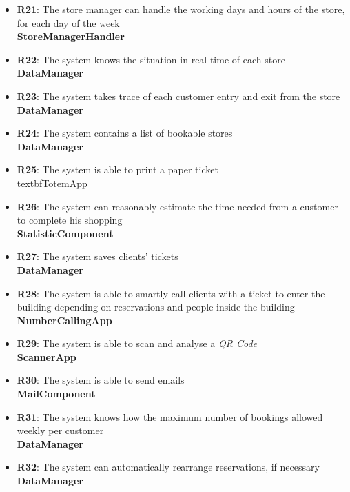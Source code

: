 \documentclass{article}
\begin{document}
\begin{itemize}
\item {\bfseries R21}: The store manager can handle the working days and hours of the store, for each day of the week \\
\textbf{StoreManagerHandler}

\item {\bfseries R22}: The system knows the situation in real time of each store \\
\textbf{DataManager}

\item {\bfseries R23}: The system takes trace of each customer entry and exit from the store \\
\textbf{DataManager}

\item {\bfseries R24}: The system contains a list of bookable stores \\
\textbf{DataManager}

\item {\bfseries R25}: The system is able to print a paper ticket \\
textbf{TotemApp}

\item {\bfseries R26}: The system can reasonably estimate the time needed from a customer to complete his shopping \\
\textbf{StatisticComponent}

\item {\bfseries R27}: The system saves clients' tickets \\
\textbf{DataManager}

\item {\bfseries R28}: The system is able to smartly call clients with a ticket to enter the building depending on reservations and people inside the building \\
\textbf{NumberCallingApp}

\item {\bfseries R29}: The system is able to scan and analyse a \emph{QR Code} \\
\textbf{ScannerApp}

\item{\bfseries R30}: The system is able to send emails \\
\textbf{MailComponent}

\item {\bfseries R31}: The system knows how the maximum number of bookings allowed weekly per customer \\
\textbf{DataManager}

\item{\bfseries R32}: The system can automatically rearrange reservations, if necessary \\
\textbf{DataManager}

\end{itemize}
\end{document}

